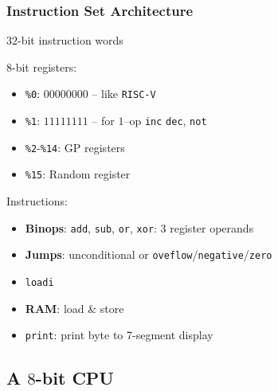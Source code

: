 \documentclass[aspectratio=169]{beamer}
\newcommand{\rv}{\texttt{RISC-V}}
\newcommand{\vrv}{\texttt{V-\rv}}
\begin{document}
\begin{frame}
	\frametitle{Instruction Set Architecture}

	$32$-bit instruction words

	$8$-bit registers:

	\begin{itemize}
		\item \texttt{\%0}: $00000000$ -- like \rv{}
		\item \texttt{\%1}: $11111111$ -- for $1$--op \texttt{inc}
		      \texttt{dec}, \texttt{not}
		\item \texttt{\%2}-\texttt{\%14}: GP registers
		\item \texttt{\%15}: Random register
	\end{itemize}

	\pause

	Instructions:
	\begin{itemize}
		\item \textbf{Binops}: \texttt{add}, \texttt{sub}, \texttt{or},
		      \texttt{xor}: $3$ register operands
		\item \textbf{Jumps}: unconditional or
		      \texttt{oveflow}/\texttt{negative}/\texttt{zero}
		\item \texttt{loadi}
		\item \textbf{RAM}: load \& store
		\item \texttt{print}: print byte to 7-segment display
	\end{itemize}
\end{frame}

\subsection{A $8$-bit CPU}
\end{document}
